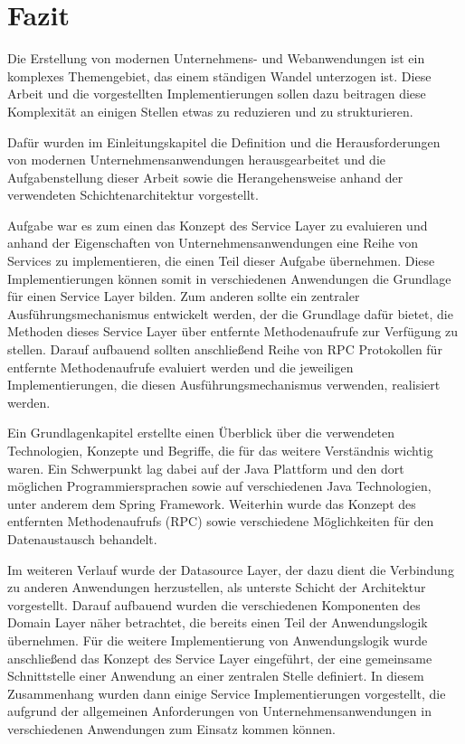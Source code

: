 \section{Fazit}
Die Erstellung von modernen Unternehmens- und Webanwendungen ist ein komplexes
Themengebiet, das einem ständigen Wandel unterzogen ist. Diese Arbeit und die
vorgestellten Implementierungen sollen dazu beitragen diese Komplexität
an einigen Stellen etwas zu reduzieren und zu strukturieren.

Dafür wurden im Einleitungskapitel die Definition und die Herausforderungen von
modernen Unternehmensanwendungen herausgearbeitet und die Aufgabenstellung dieser
Arbeit sowie die Herangehensweise anhand der verwendeten Schichtenarchitektur
vorgestellt. 

Aufgabe war es zum einen das Konzept des Service Layer zu evaluieren
und anhand der Eigenschaften von Unternehmensanwendungen eine Reihe von Services
zu implementieren, die einen Teil dieser Aufgabe übernehmen. Diese
Implementierungen können somit in verschiedenen Anwendungen die Grundlage für
einen Service Layer bilden. Zum anderen sollte ein zentraler
Ausführungsmechanismus entwickelt werden, der die Grundlage dafür bietet, die
Methoden dieses Service Layer über entfernte Methodenaufrufe zur Verfügung zu
stellen. Darauf aufbauend sollten anschließend Reihe von \ac{RPC} Protokollen für
entfernte Methodenaufrufe evaluiert werden und die jeweiligen Implementierungen,
die diesen Ausführungsmechanismus verwenden, realisiert werden.

Ein Grundlagenkapitel erstellte einen Überblick über die verwendeten
Technologien, Konzepte und Begriffe, die für das weitere Verständnis wichtig
waren. Ein Schwerpunkt lag dabei auf der Java Plattform und den dort möglichen
Programmiersprachen sowie auf verschiedenen Java Technologien, unter anderem dem
Spring Framework. Weiterhin wurde das Konzept des entfernten Methodenaufrufs
(\ac{RPC}) sowie verschiedene Möglichkeiten für den Datenaustausch behandelt.

Im weiteren Verlauf wurde der Datasource Layer, der dazu dient die Verbindung zu
anderen Anwendungen herzustellen, als unterste Schicht der Architektur
vorgestellt. Darauf aufbauend wurden die verschiedenen Komponenten des Domain
Layer näher betrachtet, die bereits einen Teil der Anwendungslogik übernehmen.
Für die weitere Implementierung von Anwendungslogik wurde anschließend das
Konzept des Service Layer eingeführt, der eine gemeinsame Schnittstelle einer
Anwendung an einer zentralen Stelle definiert. In diesem Zusammenhang wurden
dann einige Service Implementierungen vorgestellt, die aufgrund der allgemeinen
Anforderungen von Unternehmensanwendungen in verschiedenen
Anwendungen zum Einsatz kommen können.

